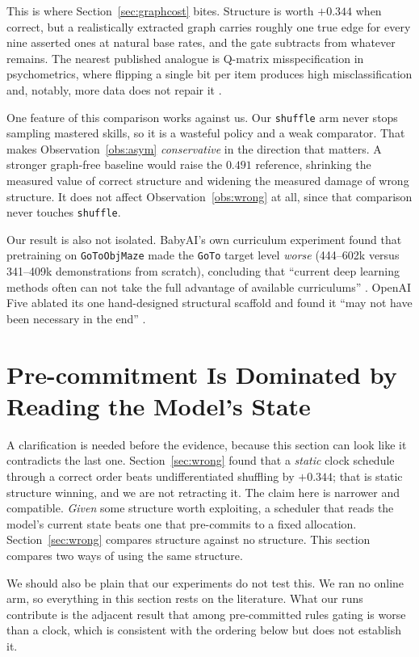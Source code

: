 \documentclass[11pt]{article}
\theoremstyle{plain}
\theoremstyle{definition}
\theoremstyle{remark}
\begin{document}
This is where Section~\ref{sec:graphcost} bites. Structure is worth $+0.344$ when
correct, but a realistically extracted graph carries roughly one true edge for
every nine asserted ones at natural base rates, and the gate subtracts from
whatever remains. The nearest published analogue is Q-matrix misspecification in
psychometrics, where flipping a single bit per item produces high
misclassification and, notably, more data does not repair it
\citep{rupp2008qmatrix}.

One feature of this comparison works against us. Our
\texttt{shuffle} arm never stops sampling mastered skills, so it is a wasteful
policy and a weak comparator. That makes Observation~\ref{obs:asym}
\emph{conservative} in the direction that matters. A stronger graph-free baseline
would raise the $0.491$ reference, shrinking the measured value of correct
structure and widening the measured damage of wrong structure. It does not affect
Observation~\ref{obs:wrong} at all, since that comparison never touches
\texttt{shuffle}.

Our result is also not isolated. BabyAI's own curriculum experiment found that
pretraining on \texttt{GoToObjMaze} made the \texttt{GoTo} target level
\emph{worse} (444--602k versus 341--409k demonstrations from scratch), concluding
that ``current deep learning methods often can not take the full advantage of
available curriculums'' \citep{chevalierboisvert2019babyai}. OpenAI Five ablated
its one hand-designed structural scaffold and found it ``may not have been
necessary in the end'' \citep{berner2019dota}.

\section{Pre-commitment Is Dominated by Reading the Model's State}
\label{sec:static}

A clarification is needed before the evidence, because this section can look like
it contradicts the last one. Section~\ref{sec:wrong} found that a \emph{static}
clock schedule through a correct order beats undifferentiated shuffling by
$+0.344$; that is static structure winning, and we are not retracting it. The
claim here is narrower and compatible. \emph{Given} some structure worth
exploiting, a scheduler that reads the model's current state beats one that
pre-commits to a fixed allocation. Section~\ref{sec:wrong} compares structure
against no structure. This section compares two ways of using the same structure.

We should also be plain that our experiments do not test this. We ran no online
arm, so everything in this section rests on the literature. What our runs
contribute is the adjacent result that among pre-committed rules gating is
worse than a clock, which is consistent with the ordering below but does not
establish it.
\end{document}
